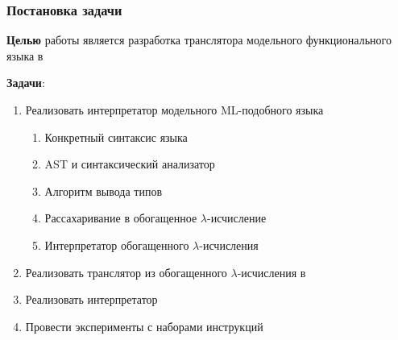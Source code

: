 \documentclass
  [ russian
  , aspectratio=169 %
  ] {beamer}
\begin{document}


\begin{frame}
    \frametitle{Постановка задачи}
    \textbf{Целью} работы является разработка транслятора модельного функционального языка в \INs{}
    \vspace{1em}

    \textbf{Задачи}:
    \begin{enumerate}
        \item Реализовать интерпретатор модельного ML-подобного языка
              \begin{enumerate}
                  \item Конкретный синтаксис языка
                  \item AST и синтаксический анализатор
                  \item Алгоритм вывода типов
                  \item Рассахаривание в обогащенное $\lambda$-исчисление
                  \item Интерпретатор обогащенного $\lambda$-исчисления
              \end{enumerate}
        \item Реализовать транслятор из обогащенного $\lambda$-исчисления в \INs{}
        \item Реализовать интерпретатор \INs{}
        \item Провести эксперименты с наборами инструкций
    \end{enumerate}
\end{frame}
\end{document}
